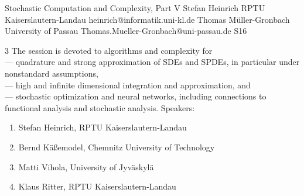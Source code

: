 \begin{session}
 {Stochastic Computation and Complexity, Part V}%
 {Stefan Heinrich}%
 {RPTU Kaiserslautern-Landau}%
 {heinrich@informatik.uni-kl.de}%
 {Thomas M\"uller-Gronbach}%
 {University of Passau}%
 {Thomas.Mueller-Gronbach@uni-passau.de}%
 {S16}%
 {}%

 {3} %
 The session is devoted to algorithms and complexity for\\
 --- quadrature and strong approximation of SDEs and SPDEs, in particular under nonstandard assumptions,\\
 --- high and infinite dimensional integration and approximation, and\\
 --- stochastic optimization and neural networks,
 including connections to functional analysis and stochastic analysis.
 \medskip
 Speakers:
 \begin{enumerate}
 \item Stefan Heinrich, RPTU Kaiserslautern-Landau
 \item Bernd K\"a\ss emodel, Chemnitz University of Technology
 \item Matti Vihola, University of Jyv\"askyl\"a
 \item Klaus Ritter, RPTU Kaiserslautern-Landau
 \end{enumerate}
\end{session}



\clearpage

